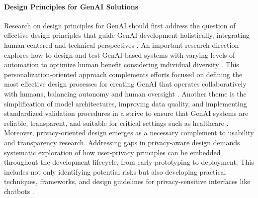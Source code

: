 \paragraph{Design Principles for GenAI Solutions}
Research on design principles for GenAI should first address the question of effective design principles that guide GenAI development holistically, integrating human-centered and technical perspectives \parencite{R04}.  
An important research direction explores how to design and test GenAI-based systems with varying levels of automation to optimize human benefit considering individual diversity \parencite{R05}. This personalization-oriented approach complements efforts focused on defining the most effective design processes for creating GenAI that operates collaboratively with humans, balancing autonomy and human oversight \parencite{R07}.  
Another theme is the simplification of model architectures, improving data quality, and implementing standardized validation procedures in a strive to ensure that GenAI systems are reliable, transparent, and suitable for critical settings such as healthcare \parencite{S07}. 
Moreover, privacy-oriented design emerges as a necessary complement to usability and transparency research. Addressing gaps in privacy-aware design demands systematic exploration of how user-privacy principles can be embedded throughout the development lifecycle, from early prototyping to deployment. This includes not only identifying potential risks but also developing practical techniques, frameworks, and design guidelines for privacy-sensitive interfaces like chatbots \parencite{S08}.  

